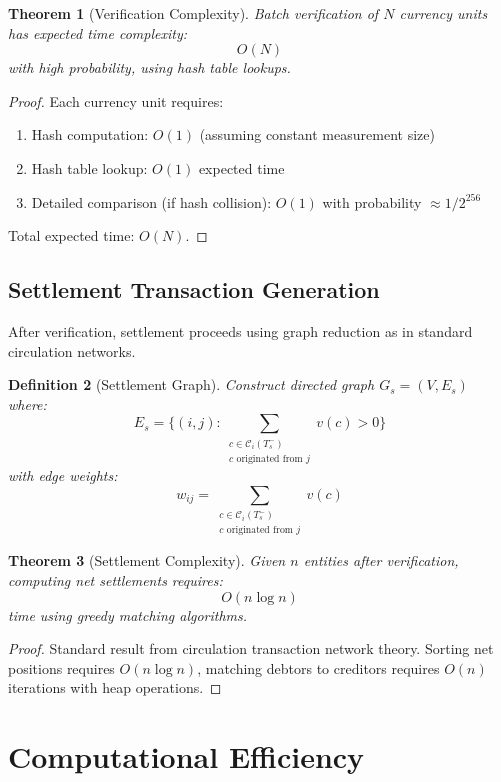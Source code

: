 \documentclass[12pt]{article}
\newtheorem{theorem}{Theorem}
\newtheorem{definition}[theorem]{Definition}
\begin{document}
\begin{theorem}[Verification Complexity]
Batch verification of $N$ currency units has expected time complexity:
$$
O(N)
$$
with high probability, using hash table lookups.
\end{theorem}

\begin{proof}
Each currency unit requires:
\begin{enumerate}
    \item Hash computation: $O(1)$ (assuming constant measurement size)
    \item Hash table lookup: $O(1)$ expected time
    \item Detailed comparison (if hash collision): $O(1)$ with probability $\approx 1/2^{256}$
\end{enumerate}
Total expected time: $O(N)$.
\end{proof}

\subsection{Settlement Transaction Generation}

After verification, settlement proceeds using graph reduction as in standard circulation networks.

\begin{definition}[Settlement Graph]
Construct directed graph $G_s = (V, E_s)$ where:
$$
E_s = \{(i,j) : \sum_{\substack{c \in \mathcal{C}_i(T_s^-) \\ c \text{ originated from } j}} v(c) > 0\}
$$
with edge weights:
$$
w_{ij} = \sum_{\substack{c \in \mathcal{C}_i(T_s^-) \\ c \text{ originated from } j}} v(c)
$$
\end{definition}

\begin{theorem}[Settlement Complexity]
Given $n$ entities after verification, computing net settlements requires:
$$
O(n \log n)
$$
time using greedy matching algorithms.
\end{theorem}

\begin{proof}
Standard result from circulation transaction network theory. Sorting net positions requires $O(n\log n)$, matching debtors to creditors requires $O(n)$ iterations with heap operations.
\end{proof}

\section{Computational Efficiency}
\end{document}
